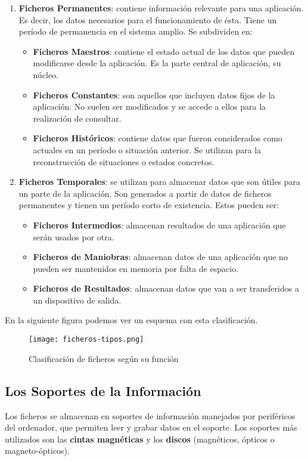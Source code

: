 \begin{enumerate}[label=(\alph*)]
    \item \textbf{Ficheros Permanentes}: contiene información relevante para una aplicación. Es decir, los datos necesarios para el funcionamiento de ésta. Tiene un período de permanencia en el sistema amplio. Se subdividen en:
    \begin{itemize}
        \item \textbf{Ficheros Maestros}: contiene el estado actual de los datos que pueden modificarse desde la aplicación. Es la parte central de aplicación, su núcleo.
        \item \textbf{Ficheros Constantes}: son aquellos que incluyen datos fijos de la aplicación. No suelen ser modificados y se accede a ellos para la realización de consultar.
        \item \textbf{Ficheros Históricos}: contiene datos que fueron considerados como actuales en un período o situación anterior. Se utilizan para la reconstrucción de situaciones o estados concretos.
    \end{itemize}

    \item \textbf{Ficheros Temporales}: se utilizan para almacenar datos que son útiles para un parte de la aplicación. Son generados a partir de datos de ficheros permanentes y tienen un período corto de existencia. Estos pueden ser:
    \begin{itemize}
        \item \textbf{Ficheros Intermedios}: almacenan resultados de una aplicación que serán usados por otra.
        \item \textbf{Ficheros de Maniobras}: almacenan datos de una aplicación que no pueden ser mantenidos en memoria por falta de espacio.
        \item \textbf{Ficheros de Resultados}: almacenan datos que van a ser transferidos a un dispositivo de salida.
    \end{itemize}
\end{enumerate}

En la siguiente figura podemos ver un esquema con esta clasificación.

\begin{figure}[ht]
    \centering
    \texttt{[image: ficheros-tipos.png]}
    \caption{Clasificación de ficheros según su función}
\end{figure}

\subsection{Los Soportes de la Información}
Los ficheros se almacenan en soportes de información manejados por periféricos del ordenador, que permiten leer y grabar datos en el soporte. Los soportes más utilizados son las \textbf{cintas magnéticas} y los \textbf{discos} (magnéticos, ópticos o magneto-ópticos).

